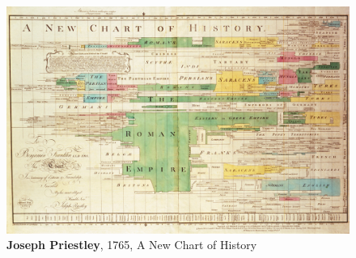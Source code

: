 \documentclass{report}
\begin{document}
\begin{figure}[h]
\vspace*{4cm}
\centerline{\includegraphics[scale=1.6]{htl}}
\caption{\textbf{Joseph Priestley}, 1765, A New Chart of History}
\end{figure}
\newpage
\end{document}
